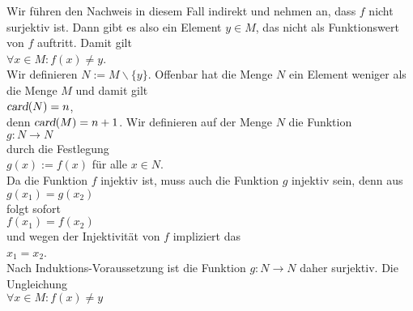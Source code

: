 \begin{enumerate}
             Wir führen den Nachweis in diesem Fall indirekt und nehmen an, dass $f$ nicht
             surjektiv ist.  Dann gibt es also ein Element $y \in M$, das nicht als Funktionswert
             von $f$ auftritt.  Damit gilt 
             \\[0.2cm]
             \hspace*{1.3cm}
             $\forall x \in M: f(x) \not= y$.
             \\[0.2cm]
             Wir definieren  $N := M \backslash \{ y \}$.  Offenbar hat die Menge $N$
             ein Element weniger als die Menge $M$ und damit gilt
             \\[0.2cm]
             \hspace*{1.3cm}
             $\textsl{card}(N) = n$,
             \\[0.2cm]
             denn $\textsl{card}(M) = n+1$.  Wir definieren auf der Menge $N$ die Funktion
             \\[0.2cm]
             \hspace*{1.3cm}
             $g:N \rightarrow N$
             \\[0.2cm]
             durch die Festlegung
             \\[0.2cm]
             \hspace*{1.3cm}
             $g(x) := f(x)$ \quad für alle $x \in N$.
             \\[0.2cm]
             Da die Funktion $f$ injektiv ist, muss auch die Funktion $g$ injektiv sein, denn aus
             \\[0.2cm]
             \hspace*{1.3cm}
             $g(x_1) = g(x_2)$
             \\[0.2cm]
             folgt sofort
             \\[0.2cm]
             \hspace*{1.3cm}
             $f(x_1) = f(x_2)$
             \\[0.2cm]
             und wegen der Injektivität von $f$ impliziert das
             \\[0.2cm]
             \hspace*{1.3cm}
             $x_1 = x_2$.
             \\[0.2cm]
             Nach Induktions-Voraussetzung ist die Funktion $g:N \rightarrow N$ daher 
             surjektiv.  Die Ungleichung
             \\[0.2cm]
             \hspace*{1.3cm}
             $\forall x \in M: f(x) \not= y$ 

\end{enumerate}
